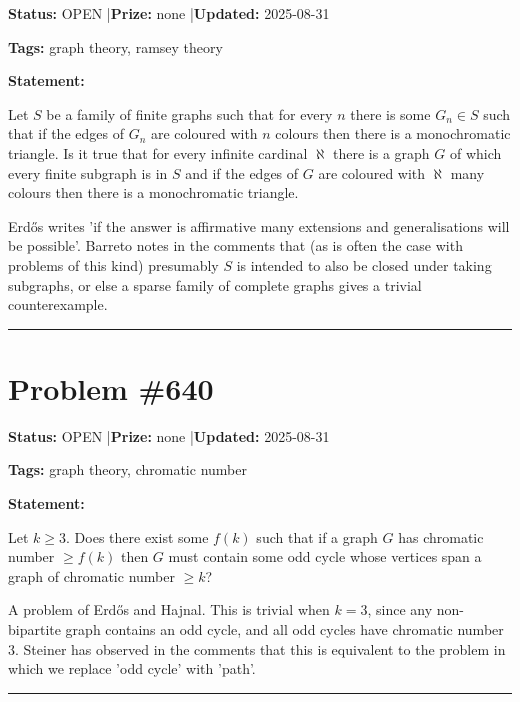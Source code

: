 \documentclass{article}
\begin{document}
\noindent\textbf{Status:} OPEN \quad|\quad \textbf{Prize:} none \quad|\quad \textbf{Updated:} 2025-08-31

\noindent\textbf{Tags:} graph theory, ramsey theory

\medskip

\noindent\textbf{Statement:}

Let $S$ be a family of finite graphs such that for every $n$ there is some $G_n\in S$ such that if the edges of $G_n$ are coloured with $n$ colours then there is a monochromatic triangle. Is it true that for every infinite cardinal $\aleph$ there is a graph $G$ of which every finite subgraph is in $S$ and if the edges of $G$ are coloured with $\aleph$ many colours then there is a monochromatic triangle.




Erd\H{o}s writes 'if the answer is affirmative many extensions and generalisations will be possible'. Barreto notes in the comments that (as is often the case with problems of this kind) presumably $S$ is intended to also be closed under taking subgraphs, or else a sparse family of complete graphs gives a trivial counterexample.

\noindent\rule{\linewidth}{0.4pt}


\section{Problem \#640}
\label{prob:640}

\noindent\textbf{Status:} OPEN \quad|\quad \textbf{Prize:} none \quad|\quad \textbf{Updated:} 2025-08-31

\noindent\textbf{Tags:} graph theory, chromatic number

\medskip

\noindent\textbf{Statement:}

Let $k\geq 3$. Does there exist some $f(k)$ such that if a graph $G$ has chromatic number $\geq f(k)$ then $G$ must contain some odd cycle whose vertices span a graph of chromatic number $\geq k$?




A problem of Erd\H{o}s and Hajnal. This is trivial when $k=3$, since any non-bipartite graph contains an odd cycle, and all odd cycles have chromatic number $3$. Steiner has observed in the comments that this is equivalent to the problem in which we replace 'odd cycle' with 'path'.

\noindent\rule{\linewidth}{0.4pt}
\end{document}
